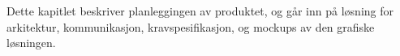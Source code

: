 Dette kapitlet beskriver planleggingen av produktet, og går inn på løsning for 
arkitektur, kommunikasjon, kravspesifikasjon, og mockups av den grafiske løsningen.